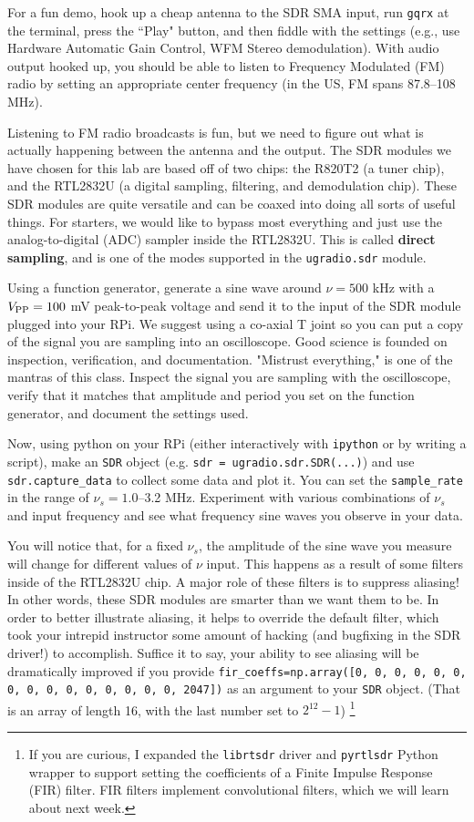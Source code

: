 \documentclass[11pt,preprint]{aastex}
\begin{document}
For a fun demo, hook up a cheap antenna to the SDR SMA input,
run {\tt gqrx} at the terminal, press the ``Play" button, and then fiddle with the
settings (e.g., use Hardware Automatic Gain Control, WFM Stereo demodulation). 
With audio output hooked up, 
you should be able to listen to Frequency Modulated (FM) 
radio by setting an appropriate center frequency (in the US, FM spans
87.8--108 MHz).

Listening to FM radio broadcasts is fun, but we need to figure out
what is actually happening between the antenna and the output.
The SDR modules we have chosen for this
lab are based off of two chips: the R820T2 (a tuner chip), and the RTL2832U (a digital
sampling, filtering, and demodulation chip).
These SDR modules are quite versatile and can be 
coaxed into doing all sorts of useful things. 
For starters, we would like to bypass most everything
and just use the analog-to-digital (ADC) sampler
inside the RTL2832U. This is called {\bf direct sampling}, and is one
of the modes supported in the 
{\tt ugradio.sdr} module.

Using a function generator, generate a sine wave around $\nu=500$ kHz with a 
$V_{\rm PP}=100$ mV peak-to-peak
voltage and send it to the input of the SDR module plugged into your RPi.
We suggest using a co-axial T joint so
you can put a copy of the signal you are sampling into an oscilloscope.
Good science is founded on inspection, verification, and documentation.
"Mistrust everything," is one of the mantras of this class.
Inspect the signal you are sampling with the oscilloscope, verify that it matches that amplitude
and period you set on the function generator, and document the settings used.

Now, using python on your RPi (either interactively with {\tt ipython} or by writing
a script), make an {\tt SDR} object (e.g. {\tt sdr = ugradio.sdr.SDR(...)})
and use {\tt sdr.capture\_data} to collect some data and plot it.
You can set the {\tt sample\_rate} in the range of $\nu_s=1.0$--3.2 MHz. Experiment
with various combinations of $\nu_s$ and input frequency and see what frequency
sine waves you observe in your data.

You will notice that, for a fixed $\nu_s$, the amplitude
of the sine wave you measure will change for different values of $\nu$ input. This
happens as a result of some filters inside of the RTL2832U chip. A
major role of these filters is to suppress aliasing! In other words,
these SDR modules are smarter than we want them to be. In order to better
illustrate aliasing, it helps to override the default filter, which
took your intrepid instructor some amount of hacking (and bugfixing
in the SDR driver!) to accomplish. Suffice it to say, your ability
to see aliasing will be dramatically improved if you provide
{\tt fir\_coeffs=np.array([0, 0, 0, 0, 0, 0, 0, 0, 0, 
0, 0, 0, 0, 0, 0, 2047])} as
an argument to your {\tt SDR} object. (That is an array of length 16,
with the last number set to $2^{12}-1$) \footnote{If you are curious, 
I expanded the {\tt librtsdr} driver and {\tt pyrtlsdr} Python wrapper
to support setting the coefficients of a Finite Impulse Response
(FIR) filter. FIR filters implement convolutional filters, which we will
learn about next week.}
\end{document}
